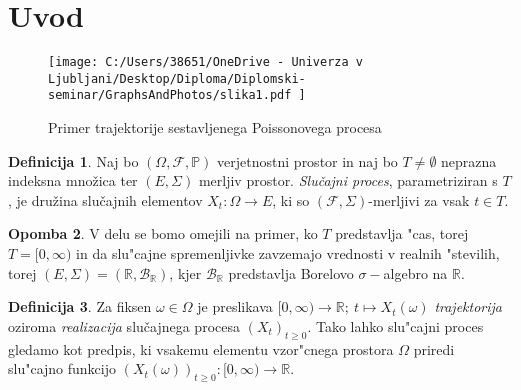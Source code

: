 \documentclass[12pt, a4paper, reqno]{amsart}
\theoremstyle{definition}
\newtheorem{definicija}{Definicija}[section]
\newtheorem{opomba}[definicija]{Opomba}
\theoremstyle{plain}
\newcommand{\R}{\mathbb{R}}
\newcommand{\B}{\mathcal{B}}
\newcommand{\1}{\mathds{1}}
\begin{document}
\section{Uvod}

    \begin{center}
    \end{center}

    \begin{figure}[H]
        \centering
        \texttt{[image: 
            C:/Users/38651/OneDrive - Univerza v Ljubljani/Desktop/Diploma/Diplomski-seminar/GraphsAndPhotos/slika1.pdf
            ]}
        \caption{Primer trajektorije sestavljenega Poissonovega procesa}
        \label{fig:slika1}
    \end{figure}
    
    \noindent


    \begin{definicija}
        Naj bo $(\Omega, \mathcal{F}, \mathbb{P})$ verjetnostni prostor in naj bo $T\neq\emptyset$
        neprazna indeksna množica ter $(E, \Sigma)$ merljiv prostor. \textit{Slučajni proces}, 
        parametriziran s $T$, je družina slučajnih elementov $X_t : \Omega \to E$,
         ki so $(\mathcal{F}, \Sigma)$-merljivi za vsak $t \in T$.
        \label{def:slucProc}
    \end{definicija}

    \begin{opomba}
        V delu se bomo omejili na primer, ko $T$ predstavlja "cas, torej $T = [0, \infty)$ in da slu"cajne
        spremenljivke 
        zavzemajo vrednosti v realnih "stevilih, torej $(E, \Sigma) = (\R, \B_{\R})$, kjer $\B_\R$ 
        predstavlja Borelovo $\sigma-$algebro na $\R$.
        \label{op:Konvencije}
    \end{opomba}


    \begin{definicija}
        Za fiksen $\omega \in \Omega$ je preslikava 
        $[0, \infty) \rightarrow \mathbb{R}; \ t \mapsto X_t(\omega)$ 
        \textit{trajektorija} oziroma \textit{realizacija} slučajnega procesa $(X_t)_{t\geq0}$.
        Tako lahko slu"cajni proces gledamo kot predpis, ki vsakemu elementu vzor"cnega prostora 
        $\Omega$ priredi slu"cajno funkcijo
        $(X_t(\omega))_{t\geq0}: [0, \infty) \rightarrow \mathbb{R}$.
        \label{def:realizac}
    \end{definicija}
\end{document}
